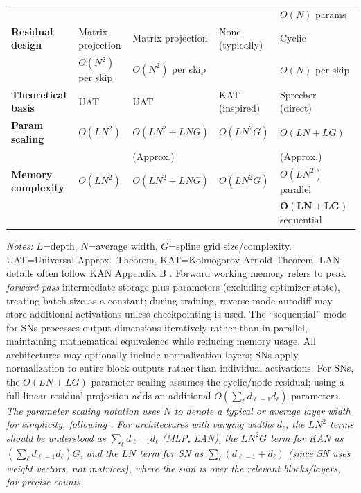 \documentclass{article}
\theoremstyle{plain}
\theoremstyle{definition}
\theoremstyle{remark}
\begin{document}
\begin{table}[ht]
\begin{tabular}{@{}lllll@{}}
                           &      &      &      & $O(N)$ params \\
\textbf{Residual design}    & Matrix projection   & Matrix projection  & None (typically)      & Cyclic \\
                          & $O(N^2)$ per skip   & $O(N^2)$ per skip  &                       & $O(N)$ per skip \\
\textbf{Theoretical basis}  & UAT                 & UAT                & KAT (inspired)        & Sprecher (direct) \\
\textbf{Param scaling}    & $O(L N^2)$          & $O(L N^2 + L N G)$ & $O(L N^2 G)$          & $O(L N + L G)$ \\
                          &                     & (Approx.)          &                       & (Approx.) \\
\textbf{Memory complexity} & $O(L N^2)$          & $O(L N^2 + L N G)$ & $O(L N^2 G)$          & $O(L N^2)$ parallel \\
                          &                     &                    &                       & $\mathbf{O(L N + L G)}$ sequential \\
\bottomrule
\end{tabular}
\vspace{2mm}
\parbox{\textwidth}{\footnotesize \textit{Notes:} $L$=depth, $N$=average width, $G$=spline grid size/complexity. UAT=Universal Approx.\ Theorem, KAT=Kolmogorov-Arnold Theorem. LAN details often follow KAN Appendix B \cite{liu2024kan}. Forward working memory refers to peak \emph{forward-pass} intermediate storage plus parameters (excluding optimizer state), treating batch size as a constant; during training, reverse-mode autodiff may store additional activations unless checkpointing is used. The ``sequential'' mode for SNs processes output dimensions iteratively rather than in parallel, maintaining mathematical equivalence while reducing memory usage. All architectures may optionally include normalization layers; SNs apply normalization to entire block outputs rather than individual activations. For SNs, the $O(LN+LG)$ parameter scaling assumes the cyclic/node residual; using a full linear residual projection adds an additional $O(\sum_{\ell} d_{\ell-1}d_{\ell})$ parameters.
\textit{The parameter scaling notation uses $N$ to denote a typical or average layer width for simplicity, following \cite{liu2024kan}. For architectures with varying widths $d_\ell$, the $LN^2$ terms should be understood as $\sum_{\ell} d_{\ell-1}d_{\ell}$ (MLP, LAN), the $LN^2G$ term for KAN as $(\sum_{\ell} d_{\ell-1}d_{\ell})G$, and the $LN$ term for SN as $\sum_{\ell} (d_{\ell-1}+d_{\ell})$ (since SN uses weight vectors, not matrices), where the sum is over the relevant blocks/layers, for precise counts.}}
\end{table}
\end{document}
